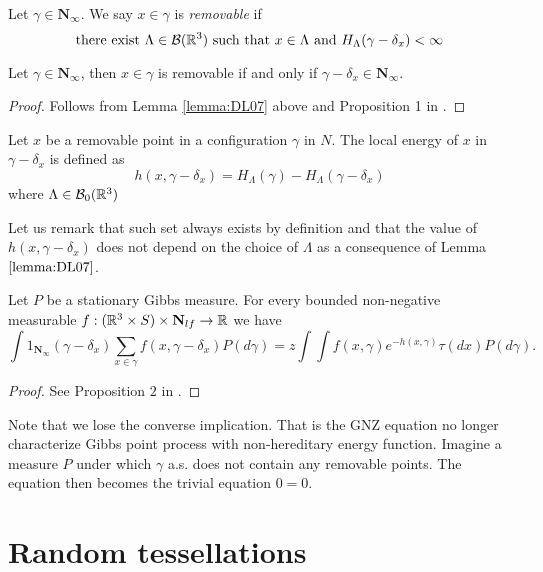 \begin{definition}
	Let $\gamma \in \mathbf N_\infty$. We say $x\in\gamma$ is \textit{removable} if 
	$$\text{there exist } \Lambda \in \mathcal B({\mathbb R^3}) \text{ such that } x\in\Lambda \text{ and } H_\Lambda(\gamma - \delta_x)<\infty$$
\end{definition}




\begin{proposition}
	Let $\gamma \in \mathbf N_\infty$, then $x\in\gamma$ is removable if and only if $\gamma - \delta_x \in \mathbf N_\infty$.
\end{proposition}
\begin{proof}
	Follows from Lemma \ref{lemma:DL07} above and Proposition 1 in \cite{DereudreLavancier2009}.	
\end{proof}


\begin{definition}\label{def:localenergy}
	Let $x$ be a removable point in a configuration $\gamma$ in $N$. The local energy of $x$ in $\gamma - \delta_x$ is defined as
	$$h(x,\gamma - \delta_x) = H_\Lambda (\gamma) - H_\Lambda(\gamma - \delta_x)$$
	where $\Lambda \in \mathcal B_0({\mathbb R^3})$
\end{definition}
Let us remark that such set always exists by definition and that the value of $h(x,\gamma-\delta_x)$ does not depend on the choice of $\Lambda$ as a consequence of Lemma $\ref{lemma:DL07}$.


\begin{proposition}
	Let $P$ be a stationary Gibbs measure. For every bounded non-negative measurable $f:({\mathbb R^3}\times S) \times \mathbf N_{lf}\to\mathbb R$ we have
	$$\int 1_{\mathbf N_\infty}(\gamma-\delta_x) \sum_{x \in \gamma} f(x,\gamma -\delta_x) P(d\gamma) = z \int \int f(x,\gamma)e^{-h(x,\gamma)} \tau(dx) P(d\gamma).$$
\end{proposition}
\begin{proof}
	See Proposition $2$ in \cite{DereudreLavancier2009}.
\end{proof}

Note that we lose the converse implication. That is the GNZ equation no longer characterize Gibbs point process with non-hereditary energy function. Imagine a measure $P$ under which $\gamma$ a.s. does not contain any removable points. The equation then becomes the trivial equation $0=0$.



\section{Random tessellations}
